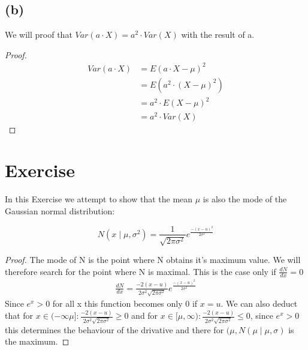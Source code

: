 \documentclass{article}
\begin{document}
\subsection*{(b)}
We will proof that $Var(a \cdot X) = a^{2} \cdot Var(X)$ with the result of a.
\begin{proof}
	\begin{align*}
		Var(a \cdot X) 
		&= E(a \cdot X - \mu)^{2} \\
		&= E(a^{2} \cdot (X - \mu)^{2} )\\
		&= a^{2} \cdot E(X - \mu)^{2} \\
		&= a^{2} \cdot Var(X)
	\end{align*}
\end{proof}

\section*{Exercise }

In this Exercise we attempt to show that the mean $\mu$ is also the mode of the Gaussian normal distribution:

\[
N(x \mid \mu, \sigma^2)= \frac{1}{\sqrt{2 \pi \sigma^2}}e^{\frac{-(x-u)^2}{2\sigma^2}}    
\]



\begin{proof}
    The mode of N is the point where N obtains it's maximum value. We will therefore search for the point where N is maximal. This is the case only if $\frac{dN}{dx}=0$ 
    \begin{align*}
        \frac{dN}{dx}=  \frac{-2(x-u)}{2\sigma^2 \sqrt{2 \pi \sigma^2}}e^{\frac{-(x-u)^2}{2\sigma^2}}  
    \end{align*}
    Since $e^x>0$ for all x this function becomes only 0 if $x=u$. We can also deduct that for $x \in (- \infty \mu] : \frac{-2(x-u)}{2\sigma^2 \sqrt{2 \pi \sigma^2}} \geq 0$ and  for $x \in [\mu, \infty) : \frac{-2(x-u)}{2\sigma^2 \sqrt{2 \pi \sigma^2}} \leq 0$, since $e^x>0$ this determines the behaviour of the drivative and there for $(\mu, N(\mu \mid \mu,\sigma)$ is the maximum.

\end{proof}


\end{document}
